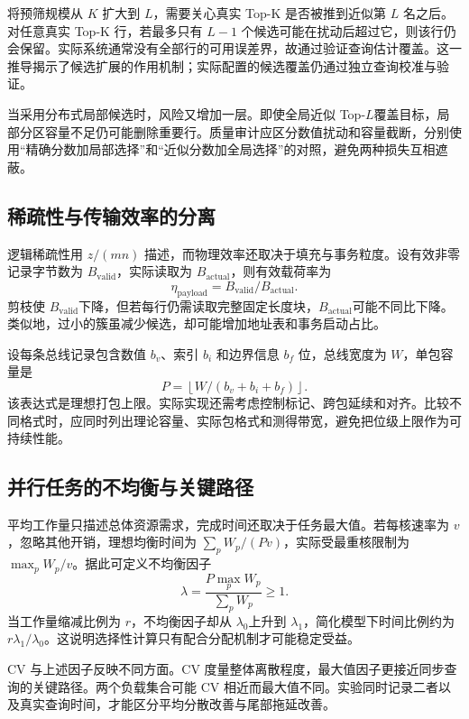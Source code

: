 将预筛规模从 $K$ 扩大到 $L$，需要关心真实 Top-K 是否被推到近似第 $L$ 名之后。对任意真实 Top-K 行，若最多只有 $L-1$ 个候选可能在扰动后超过它，则该行仍会保留。实际系统通常没有全部行的可用误差界，故通过验证查询估计覆盖。这一推导揭示了候选扩展的作用机制；实际配置的候选覆盖仍通过独立查询校准与验证。

当采用分布式局部候选时，风险又增加一层。即使全局近似 Top-$L$覆盖目标，局部分区容量不足仍可能删除重要行。质量审计应区分数值扰动和容量截断，分别使用“精确分数加局部选择”和“近似分数加全局选择”的对照，避免两种损失互相遮蔽。

\subsection{稀疏性与传输效率的分离}
逻辑稀疏性用 $z/(mn)$ 描述，而物理效率还取决于填充与事务粒度。设有效非零记录字节数为 $B_{\mathrm{valid}}$，实际读取为 $B_{\mathrm{actual}}$，则有效载荷率为
\begin{equation}
 \eta_{\mathrm{payload}}=B_{\mathrm{valid}}/B_{\mathrm{actual}}.
\end{equation}
剪枝使 $B_{\mathrm{valid}}$下降，但若每行仍需读取完整固定长度块，$B_{\mathrm{actual}}$可能不同比下降。类似地，过小的簇虽减少候选，却可能增加地址表和事务启动占比。

设每条总线记录包含数值 $b_v$、索引 $b_i$ 和边界信息 $b_f$ 位，总线宽度为 $W$，单包容量是
\begin{equation}
 P=\left\lfloor W/(b_v+b_i+b_f)\right\rfloor.
\end{equation}
该表达式是理想打包上限。实际实现还需考虑控制标记、跨包延续和对齐。比较不同格式时，应同时列出理论容量、实际包格式和测得带宽，避免把位级上限作为可持续性能。

\subsection{并行任务的不均衡与关键路径}
平均工作量只描述总体资源需求，完成时间还取决于任务最大值。若每核速率为 $v$，忽略其他开销，理想均衡时间为 $\sum_pW_p/(Pv)$，实际受最重核限制为 $\max_pW_p/v$。据此可定义不均衡因子
\begin{equation}
 \lambda=\frac{P\max_pW_p}{\sum_pW_p}\geq1.
\end{equation}
当工作量缩减比例为 $r$，不均衡因子却从 $\lambda_0$上升到 $\lambda_1$，简化模型下时间比例约为 $r\lambda_1/\lambda_0$。这说明选择性计算只有配合分配机制才可能稳定受益。

CV 与上述因子反映不同方面。CV 度量整体离散程度，最大值因子更接近同步查询的关键路径。两个负载集合可能 CV 相近而最大值不同。实验同时记录二者以及真实查询时间，才能区分平均分散改善与尾部拖延改善。

